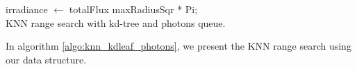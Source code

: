 \begin{algorithm}
	\Return irradiance \(\leftarrow\) totalFlux \/ maxRadiusSqr * Pi; \\ 
	
	\caption{KNN range search with kd-tree and photons queue.} 	
	\label{algo:knn_kdleaf_photons} 
\end{algorithm}

In algorithm \ref{algo:knn_kdleaf_photons}, we present the KNN range search using our data structure. 

